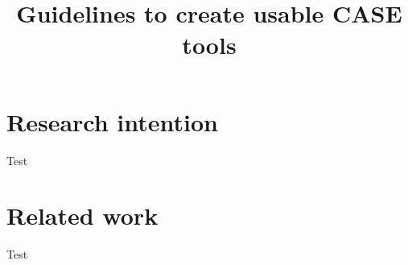 \documentclass[conference]{IEEEtran}
\begin{document}
\title{Guidelines to create usable CASE tools\\
}

\author{
}

\maketitle



\section{Research intention}


Test \cite{helena_et_al}


\section{Related work}

Test

\begin{comment}

\end{comment}



\end{document}
